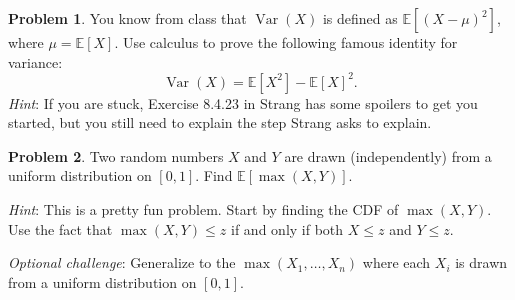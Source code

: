 \documentclass[11pt,oneside]{amsart}
\theoremstyle{definition}
\newtheorem{problem}{Problem}
\newcommand{\bE}{\mathbb{E}}
\DeclareMathOperator{\Var}{Var}
\begin{document}
    \begin{problem}
        You know from class that $\Var(X)$ is defined as $\bE[(X-\mu)^2]$, where $\mu=\bE[X]$. Use calculus to prove the following famous identity for variance:
        \[\Var(X)=\bE[X^2]-\bE[X]^2.\]
        \emph{Hint}: If you are stuck, Exercise 8.4.23 in Strang has some spoilers to get you started, but you still need to explain the step Strang asks to explain.
    \end{problem}
    
    \begin{problem}
        Two random numbers $X$ and $Y$ are drawn (independently) from a uniform distribution on $[0,1]$. Find $\bE[\max(X,Y)]$.

        \emph{Hint}: This is a pretty fun problem. Start by finding the CDF of $\max(X,Y)$. Use the fact that $\max(X,Y)\leq z$ if and only if both $X\leq z$ and $Y\leq z$.

        \emph{Optional challenge}: Generalize to the $\max(X_1,\dots,X_n)$ where each $X_i$ is drawn from a uniform distribution on $[0,1]$.
    \end{problem}


\end{document}
